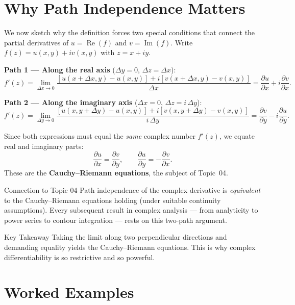 \documentclass[12pt,a4paper]{article}
\begin{document}
\section{Why Path Independence Matters}

We now sketch why the definition forces two special conditions that connect the partial
derivatives of $u = \operatorname{Re}(f)$ and $v = \operatorname{Im}(f)$.
Write $f(z) = u(x,y) + iv(x,y)$ with $z = x + iy$.

\medskip\noindent\textbf{Path 1 --- Along the real axis} ($\Delta y = 0$, $\Delta z = \Delta x$):
\[
  f'(z) = \lim_{\Delta x \to 0} \frac{[u(x+\Delta x, y)-u(x,y)] + i[v(x+\Delta x,y)-v(x,y)]}{\Delta x}
        = \frac{\partial u}{\partial x} + i\frac{\partial v}{\partial x}.
\]

\medskip\noindent\textbf{Path 2 --- Along the imaginary axis} ($\Delta x = 0$, $\Delta z = i\,\Delta y$):
\[
  f'(z) = \lim_{\Delta y \to 0}
          \frac{[u(x,y+\Delta y)-u(x,y)] + i[v(x,y+\Delta y)-v(x,y)]}{i\,\Delta y}
        = \frac{\partial v}{\partial y} - i\frac{\partial u}{\partial y}.
\]

Since both expressions must equal the \emph{same} complex number $f'(z)$, we equate
real and imaginary parts:
\[
  \frac{\partial u}{\partial x} = \frac{\partial v}{\partial y},
  \qquad
  \frac{\partial u}{\partial y} = -\frac{\partial v}{\partial x}.
\]
These are the \textbf{Cauchy--Riemann equations}, the subject of Topic~04.

\begin{infobox}{Connection to Topic 04}
Path independence of the complex derivative is \emph{equivalent} to the
Cauchy--Riemann equations holding (under suitable continuity assumptions).
Every subsequent result in complex analysis --- from analyticity to power series
to contour integration --- rests on this two-path argument.
\end{infobox}

\begin{learnbox}{Key Takeaway}
Taking the limit along two perpendicular directions and demanding equality
yields the Cauchy--Riemann equations. This is why complex differentiability
is so restrictive and so powerful.
\end{learnbox}

\section{Worked Examples}
\end{document}
